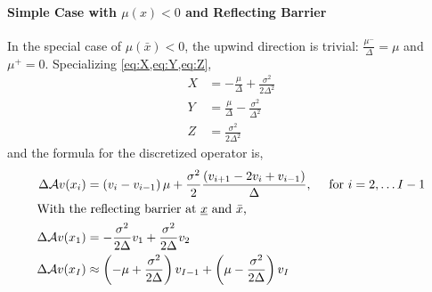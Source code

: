 \documentclass[11pt]{etk-article}
\begin{document}
\paragraph{Simple Case with $\mu(x) < 0$ and Reflecting Barrier}
In the special case of $\mu(\bar{x}) < 0$, the upwind direction is trivial: $\frac{\mu^{-}}{\Delta} = \mu$ and $\mu^{+} = 0$.  Specializing \cref{eq:X,eq:Y,eq:Z},
\begin{align}
	X &= - \frac{\mu}{\Delta}+ \frac{\sigma^{2}}{2 \Delta^2}\label{eq:X-backwards} \\
	Y &= \frac{\mu}{\Delta} - \frac{\sigma^{2}}{\Delta^2}\label{eq:Y-backwards} \\
	Z &= \frac{\sigma^{2}}{2 \Delta^2}\label{eq:Z-backwards}
\end{align}
and the formula for the discretized operator is,
\begin{align}
	\Delta \mathcal{A} v(x_i)  &= \left(v_i-v_{i-1}\right)\mu + \frac{\sigma^2}{2} \frac{\left(v_{i+1} - 2 v_i + v_{i-1}\right)}{\Delta},\quad \text{ for } i = 2,\ldots I-1\\
	\intertext{With the reflecting barrier at $\underline{x}$ and $\bar{x}$,}
	\Delta \mathcal{A} v(x_1) &= -\frac{\sigma^{2}}{2\Delta}v_1 + \frac{\sigma^{2}}{2\Delta} v_2\\
\Delta \mathcal{A} v(x_I)&\approx \left(-\mu +\frac{\sigma^2}{2\Delta}\right) v_{I-1} + \left(\mu - \frac{\sigma^2}{2\Delta}\right) v_I 
\end{align}
\end{document}
